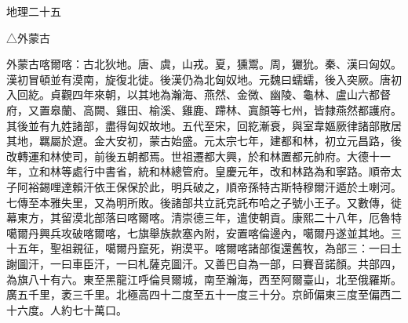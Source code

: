 
\begin{pinyinscope}
地理二十五

△外蒙古

外蒙古喀爾喀：古北狄地。唐、虞，山戎。夏，獯鬻。周，玁狁。秦、漢曰匈奴。漢初冒頓並有漠南，旋復北徙。後漢仍為北匈奴地。元魏曰蠕蠕，後入突厥。唐初入回紇。貞觀四年來朝，以其地為瀚海、燕然、金微、幽陵、龜林、盧山六都督府，又置皋蘭、高闕、雞田、榆溪、雞鹿、蹛林、寘顏等七州，皆隸燕然都護府。其後並有九姓諸部，盡得匈奴故地。五代至宋，回紇漸衰，與室韋嫗厥律諸部散居其地，羈屬於遼。金大安初，蒙古始盛。元太宗七年，建都和林，初立元昌路，後改轉運和林使司，前後五朝都焉。世祖遷都大興，於和林置都元帥府。大德十一年，立和林等處行中書省，統和林總管府。皇慶元年，改和林路為和寧路。順帝太子阿裕錫哩達賴汗依王保保於此，明兵破之，順帝孫特古斯特穆爾汗遁於土喇河。七傳至本雅失里，又為明所敗。後諸部共立託克託布哈之子號小王子。又數傳，徙幕東方，其留漠北部落曰喀爾喀。清崇德三年，遣使朝貢。康熙二十八年，厄魯特噶爾丹興兵攻破喀爾喀，七旗舉族款塞內附，安置喀倫邊內，噶爾丹遂並其地。三十五年，聖祖親征，噶爾丹竄死，朔漠平。喀爾喀諸部復還舊牧，為部三：一曰土謝圖汗，一曰車臣汗，一曰札薩克圖汗。又善巴自為一部，曰賽音諾顏。共部四，為旗八十有六。東至黑龍江呼倫貝爾城，南至瀚海，西至阿爾臺山，北至俄羅斯。廣五千里，袤三千里。北極高四十二度至五十一度三十分。京師偏東三度至偏西二十六度。人約七十萬口。


\end{pinyinscope}
